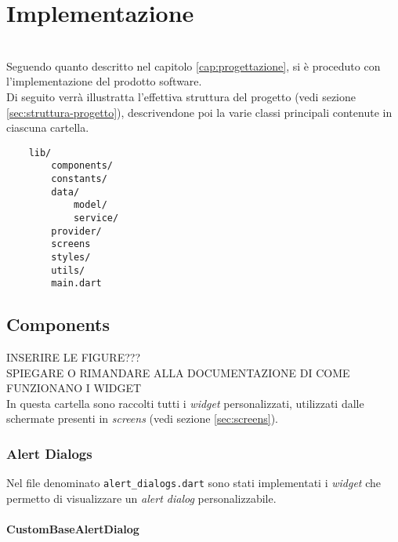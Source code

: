 \chapter{Implementazione}
\label{cap:implementazione}

\\

Seguendo quanto descritto nel capitolo \ref{cap:progettazione}, si è proceduto con l'implementazione del prodotto software.\\
Di seguito verrà illustratta l'effettiva struttura del progetto (vedi sezione \ref{sec:struttura-progetto}), descrivendone poi la varie classi principali contenute in ciascuna cartella. \\

\begin{verbatim}
    lib/
        components/
        constants/
        data/
            model/
            service/
        provider/
        screens
        styles/
        utils/
        main.dart
\end{verbatim}

\section{Components}
\label{sec:components}

INSERIRE LE FIGURE???\\
SPIEGARE O RIMANDARE ALLA DOCUMENTAZIONE DI COME FUNZIONANO I WIDGET\\

In questa cartella sono raccolti tutti i \emph{widget} personalizzati, utilizzati dalle schermate presenti in \emph{screens} (vedi sezione \ref{sec:screens}).\\

\subsection{Alert Dialogs}
\label{subsec:alert-dialogs}

Nel file denominato \lstinline{alert_dialogs.dart} sono stati implementati i \emph{widget} che permetto di visualizzare un \emph{alert dialog} personalizzabile.\\

\subsubsection*{CustomBaseAlertDialog}
\label{subsubsec:custom-base-alert-dialog}


